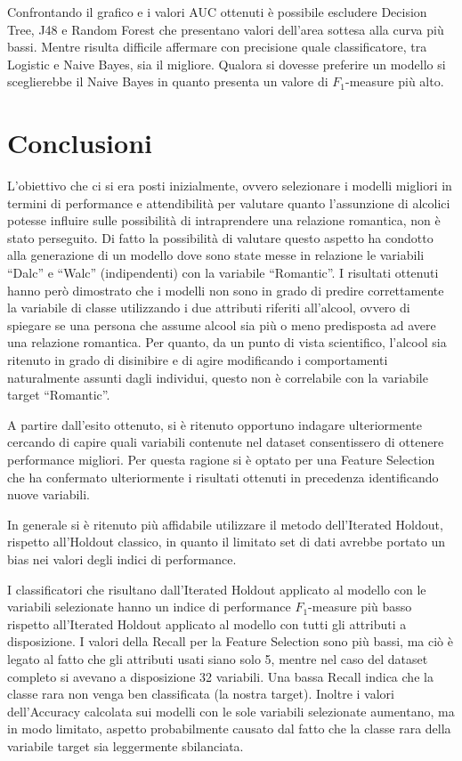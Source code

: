 \documentclass[12pt,a4paper]{report}
\begin{document}
\begin{multicols}{2}
Confrontando il grafico e i valori AUC ottenuti è possibile escludere Decision Tree, J48 e Random Forest che presentano valori dell'area sottesa alla curva più bassi. Mentre risulta difficile affermare con precisione quale classificatore, tra Logistic e Naive Bayes, sia il migliore. Qualora si dovesse preferire un modello si sceglierebbe il Naive Bayes in quanto presenta un valore di $F_1$-measure più alto.

 
\chapter{Conclusioni}

L’obiettivo che ci si era posti inizialmente, ovvero selezionare i modelli migliori in termini di performance e attendibilità per valutare quanto l’assunzione di alcolici potesse influire sulle possibilità di intraprendere una relazione romantica, non è stato perseguito. Di fatto la possibilità di valutare questo aspetto ha condotto alla generazione di un modello dove sono state messe in relazione le variabili “Dalc” e “Walc” (indipendenti) con la variabile “Romantic”. I risultati ottenuti hanno però dimostrato che i modelli non sono in grado di predire correttamente la variabile di classe utilizzando i due attributi riferiti all’alcool, ovvero di spiegare se una persona che assume alcool sia più o meno predisposta ad avere una relazione romantica. Per quanto, da un punto di vista scientifico, l’alcool sia ritenuto in grado di disinibire e di agire modificando i comportamenti naturalmente assunti dagli individui, questo non è correlabile con la variabile target “Romantic”.

A partire dall’esito ottenuto, si è ritenuto opportuno indagare ulteriormente cercando di capire quali variabili contenute nel dataset consentissero di ottenere performance migliori. Per questa ragione si è optato per una Feature Selection che ha confermato ulteriormente i risultati ottenuti in precedenza identificando nuove variabili. 

In generale si è ritenuto più affidabile utilizzare il metodo  dell’Iterated Holdout, rispetto all’Holdout classico, in quanto il limitato set di dati avrebbe portato un bias nei valori degli indici di performance.

I classificatori che risultano dall’Iterated Holdout applicato al modello con le variabili selezionate hanno un indice di performance $F_1$-measure più basso rispetto all’Iterated Holdout applicato al modello con tutti gli attributi a disposizione. I valori della Recall per la Feature Selection sono più bassi, ma ciò è legato al fatto che gli attributi usati siano solo 5, mentre nel caso del dataset completo si avevano a disposizione 32 variabili. Una bassa Recall indica che la classe rara non venga ben classificata (la nostra target). Inoltre i valori dell’Accuracy calcolata sui modelli con le sole variabili selezionate aumentano, ma in modo limitato, aspetto probabilmente causato dal fatto che la classe rara della variabile target sia leggermente sbilanciata.


\end{multicols}
\end{document}
